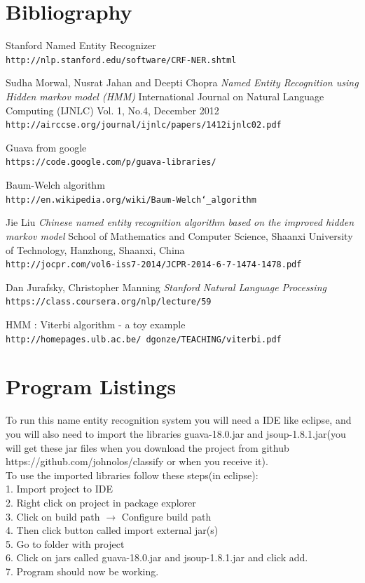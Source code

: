 \documentclass{article}
\begin{document}
\section{Bibliography}
\begin{thebibliography}{9}
Stanford Named Entity Recognizer
\\\texttt{http://nlp.stanford.edu/software/CRF-NER.shtml}

Sudha Morwal, Nusrat Jahan and Deepti Chopra
\textit{Named Entity Recognition using Hidden markov model (HMM)}
International Journal on Natural Language Computing (IJNLC) Vol. 1, No.4, December 2012
\\\texttt{http://airccse.org/journal/ijnlc/papers/1412ijnlc02.pdf}

Guava from google
\\\texttt{https://code.google.com/p/guava-libraries/}

Baum-Welch algorithm
\\\texttt{http://en.wikipedia.org/wiki/Baum-Welch\char`_algorithm}

Jie Liu 
\textit{Chinese named entity recognition algorithm based on the improved hidden markov model}
School of Mathematics and Computer Science, Shaanxi University of Technology, Hanzhong, Shaanxi, China
\\\texttt{http://jocpr.com/vol6-iss7-2014/JCPR-2014-6-7-1474-1478.pdf}

Dan Jurafsky, Christopher Manning
\textit{Stanford Natural Language Processing}
\\\texttt{https://class.coursera.org/nlp/lecture/59}

HMM : Viterbi algorithm - a toy example
\\\texttt{http://homepages.ulb.ac.be/~dgonze/TEACHING/viterbi.pdf}
\end{thebibliography}
\clearpage
\section{Program Listings}
To run this name entity recognition system you will need a IDE like eclipse, and you will also need to import the libraries guava-18.0.jar and jsoup-1.8.1.jar(you will get these jar files when you download the project from github\\
https://github.com/johnolos/classify or when you receive it).\\
To use the imported libraries follow these steps(in eclipse):\\
1. Import project to IDE\\
2. Right click on project in package explorer\\
3. Click on build path $\rightarrow$ Configure build path\\
4. Then click button called import external jar(s)\\
5. Go to folder with project\\
6. Click on jars called guava-18.0.jar and jsoup-1.8.1.jar and click add.\\
7. Program should now be working.
\clearpage
\end{document}
